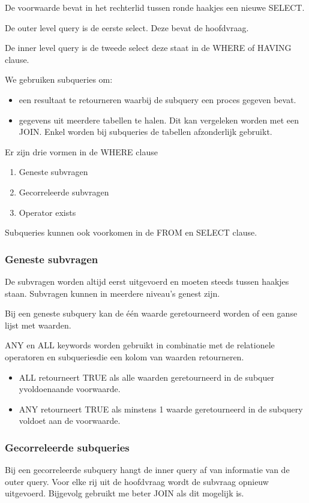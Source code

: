 \documentclass[a4paper,12pt]{article}
\begin{document}
De voorwaarde bevat in het rechterlid tussen ronde haakjes een nieuwe SELECT.

De outer level query is de eerste select. Deze bevat de hoofdvraag.

De inner level query is de tweede select deze staat in de WHERE of HAVING clause.

We gebruiken subqueries om:
\begin{itemize}
\item een resultaat te retourneren waarbij de subquery een proces gegeven bevat.
\item gegevens uit meerdere tabellen te halen. Dit kan vergeleken worden met een JOIN.
Enkel worden bij subqueries de tabellen afzonderlijk gebruikt.
\end{itemize}

Er zijn drie vormen in de WHERE clause
\begin{enumerate}
\item Geneste subvragen
\item Gecorreleerde subvragen
\item Operator exists
\end{enumerate}

Subqueries kunnen ook voorkomen in de FROM en SELECT clause.

\subsubsection{Geneste subvragen}
De subvragen worden altijd eerst uitgevoerd en moeten steeds tussen haakjes staan. Subvragen kunnen in meerdere niveau's genest zijn.

Bij een geneste subquery kan de één waarde geretourneerd worden of een ganse lijst met waarden.

ANY en ALL keywords worden gebruikt in combinatie met de relationele operatoren en subqueriesdie een kolom van waarden retourneren.

\begin{itemize}
\item ALL retourneert TRUE als alle waarden geretourneerd in de subquer yvoldoenaande voorwaarde.
\item ANY retourneert TRUE als minstens 1 waarde geretourneerd in de subquery voldoet aan de voorwaarde.
\end{itemize}

\subsubsection{Gecorreleerde subqueries}
Bij een gecorreleerde subquery hangt de inner query af van informatie van de outer query. Voor elke rij uit de hoofdvraag wordt de subvraag opnieuw uitgevoerd. Bijgevolg gebruikt me beter JOIN als dit mogelijk is.
\end{document}

